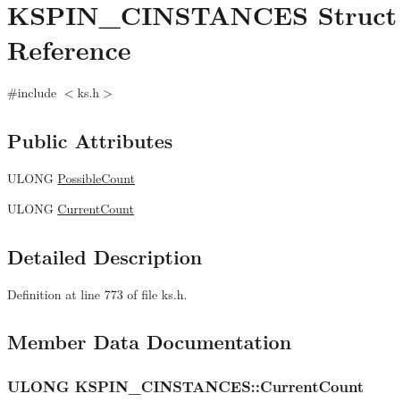 \hypertarget{struct_k_s_p_i_n___c_i_n_s_t_a_n_c_e_s}{}\section{K\+S\+P\+I\+N\+\_\+\+C\+I\+N\+S\+T\+A\+N\+C\+ES Struct Reference}
\label{struct_k_s_p_i_n___c_i_n_s_t_a_n_c_e_s}


{\ttfamily \#include $<$ks.\+h$>$}

\subsection*{Public Attributes}
\begin{DoxyCompactItemize}
\item 
U\+L\+O\+NG \hyperlink{struct_k_s_p_i_n___c_i_n_s_t_a_n_c_e_s_ad520ef055d9c8a1cf8ea529c64e8e2a2}{Possible\+Count}
\item 
U\+L\+O\+NG \hyperlink{struct_k_s_p_i_n___c_i_n_s_t_a_n_c_e_s_a28f1c626e0e333984d485d83822c1853}{Current\+Count}
\end{DoxyCompactItemize}


\subsection{Detailed Description}


Definition at line 773 of file ks.\+h.



\subsection{Member Data Documentation}
\subsubsection[{\texorpdfstring{Current\+Count}{CurrentCount}}]{\setlength{\rightskip}{0pt plus 5cm}U\+L\+O\+NG K\+S\+P\+I\+N\+\_\+\+C\+I\+N\+S\+T\+A\+N\+C\+E\+S\+::\+Current\+Count}\hypertarget{struct_k_s_p_i_n___c_i_n_s_t_a_n_c_e_s_a28f1c626e0e333984d485d83822c1853}{}\label{struct_k_s_p_i_n___c_i_n_s_t_a_n_c_e_s_a28f1c626e0e333984d485d83822c1853}



